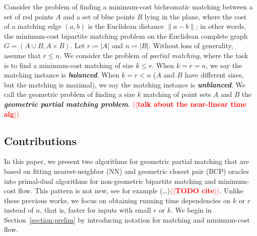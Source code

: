 \documentclass[a4paper,UKenglish]{socg-lipics-v2018}
\makeatletter
\def\note#1{\textcolor{red}{{#1}}}
\def\polylog{\mathop{\mathrm{polylog}}}
\theoremstyle{plain}
\numberwithin{figure}{section}
\def\EMPH#1{\textbf{\emph{\boldmath #1}}}
\def\n@te#1{\textsf{\boldmath \textbf{$\langle\!\langle$#1$\rangle\!\rangle$}}\leavevmode}
\def\note#1{\textcolor{red}{\n@te{#1}}}
\makeatother
\begin{document}
Consider the problem of finding a minimum-cost bichromatic matching between
a set of red points $A$ and a set of blue points $B$ lying in the plane,
where the cost of a matching edge $(a, b)$ is the Euclidean distance
$\|a - b\|$;
in other words, the minimum-cost bipartite matching problem on the Euclidean
complete graph $G = (A \cup B, A \times B)$.
Let $r \coloneqq |A|$ and $n \coloneqq |B|$.
Without loss of generality, assume that $r \leq n$.
We consider the problem of \emph{partial matching}, where the task is to
find a minimum-cost matching of size $k \leq r$.
When $k = r = n$, we say the matching instance is \EMPH{balanced}.
When $k = r < n$ ($A$ and $B$ have different sizes, but the matching is
maximal), we say the matching instance is \EMPH{unblanced}.
We call the geometric problem of finding a size $k$ matching of point sets $A$
and $B$ the \EMPH{geometric partial matching problem}.
%
\note{talk about the near-linear time alg}%


\subsection{Contributions}

In this paper, we present two algorithms for geometric partial matching
that are based on fitting nearest-neighbor (NN) and geometric closest pair
(BCP) oracles into primal-dual algorithms for non-geometric bipartite matching
and minimum-cost flow.
This pattern is not new, see for example
(\dots)\note{TODO cite}.
Unlike these previous works, we focus on obtaining running time dependencies on
$k$ or $r$ instead of $n$, that is, faster for inputs with small $r$ or $k$.
We begin in Section~\ref{section:prelim} by introducing notation for matching
and minimum-cost flow.

\end{document}
